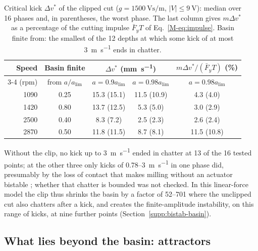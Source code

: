 \begin{table}[!tbp]
  \centering
  \caption{Critical kick $\Delta v^*$ of the clipped cut ($g=\SI{1500}{\volt\second\per\metre}$, $\lvert V\rvert\le\SI{9}{\volt}$): median over 16 phases and, in parentheses, the worst phase. The last column gives $m\Delta v^*$ as a percentage of the cutting impulse $\bar F_yT$ of Eq.~\eqref{M-eq:impulse}. Basin finite from: the smallest of the 12 depths at which some kick of at most \SI{3}{\metre\per\second} ends in chatter.}
  \label{tab:basin}
  \begin{tabular}{@{}rcccc@{}}
    \toprule
    Speed & Basin finite & \multicolumn{2}{c}{$\Delta v^*$ (\si{\milli\metre\per\second})} & $m\Delta v^*/(\bar F_yT)$ (\si{\percent})\\
    \cmidrule(lr){3-4}
    (rpm) & from $a/a_{\lim}$ & $a=0.9a_{\lim}$ & $a=0.98a_{\lim}$ & $a=0.98a_{\lim}$\\
    \midrule
    1090 & 0.25 & 15.3 (15.1) & 11.5 (10.9) & 4.3 (4.0)\\
    1420 & 0.80 & 13.7 (12.5) & 5.3 (5.0)   & 3.0 (2.9)\\
    2500 & 0.40 & 8.3 (7.2)   & 2.5 (2.3)   & 2.6 (2.4)\\
    2870 & 0.50 & 11.8 (11.5) & 8.7 (8.1)   & 11.5 (10.8)\\
    \bottomrule
  \end{tabular}
\end{table}

Without the clip, no kick up to \SI{3}{\metre\per\second} ended in chatter at 13 of the 16 tested points; at the other three only kicks of 0.78--\SI{3}{\metre\per\second} in one phase did, presumably by the loss of contact that makes milling without an actuator bistable \citep{dombovari2015bistable}; whether that chatter is bounded was not checked. In this linear-force model the clip thus shrinks the basin by a factor of 52--701 where the unclipped cut also chatters after a kick, and creates the finite-amplitude instability, on this range of kicks, at nine further points (Section~\ref{supp:bistab-basin}).

\subsection{What lies beyond the basin: attractors}\label{supp:std-bistab-attr}

